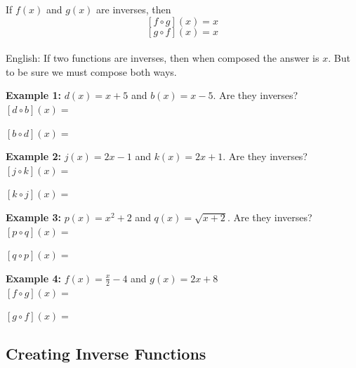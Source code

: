 \documentclass[12pt]{article}
\begin{document}
If $f(x)$ and $g(x)$ are inverses, then
$$[f \circ g](x)=x$$ $$[g \circ f](x)=x$$\\

English: If two functions are inverses, then when composed the answer is $x$. But to be sure we must compose both ways.\\

\clearpage

\textbf{Example 1:} $d(x)=x+5$ and $b(x)=x-5$. Are they inverses?\\

$[d \circ b](x)=$\\

\vspace{.65in}

$[b \circ d](x)=$\\

\vspace{.65in}

\textbf{Example 2:} $j(x)=2x-1$ and $k(x)=2x+1$. Are they inverses?\\

$[j \circ k](x)=$

\vspace{.65in}

$[k \circ j](x)=$\\

\vspace{.65in}

\textbf{Example 3:} $p(x)=x^2+2$ and $q(x)=\sqrt{x+2}$. Are they inverses?\\

$[p \circ q](x)=$\\

\vspace{.65in}

$[q \circ p](x)=$\\

\vspace{.65in}

\textbf{Example 4:} $f(x)=\frac{x}{2}-4$ and $g(x)=2x+8$\\

$[f \circ g](x)=$\\

\vspace{.65in}

$[g \circ f](x)=$\\



\subsection{Creating Inverse Functions}
\end{document}
